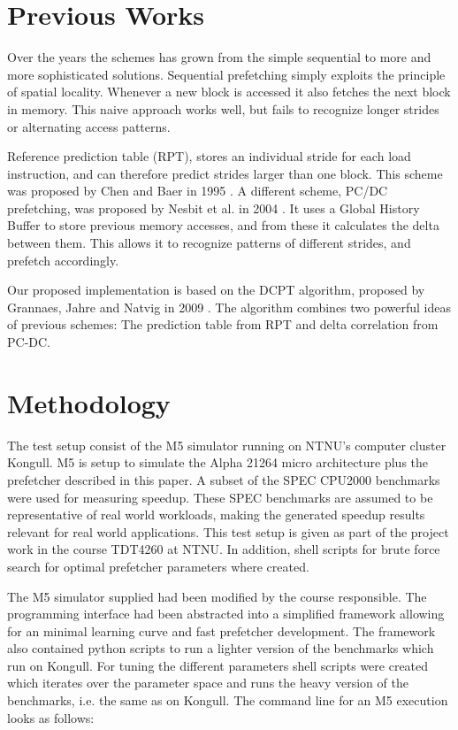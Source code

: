 \documentclass[12pt,journal,compsoc]{IEEEtran}
\begin{document}
\section{Previous Works}
Over the years the schemes has grown from the simple sequential to more and
more sophisticated solutions. Sequential prefetching simply exploits the
principle of spatial locality. Whenever a new block is accessed it also
fetches the next block in memory. This naive approach works well, but fails
to recognize longer strides or alternating access patterns.

Reference prediction table (RPT), stores an individual stride for each load
instruction, and can therefore predict strides larger than one block. This
scheme was proposed by Chen and Baer in 1995 \cite{rptpaper}. A different scheme,
PC/DC prefetching, was proposed by Nesbit et al. in 2004 \cite{pcdcpaper}. It
uses a Global History Buffer to store previous memory accesses, and from these
it calculates the delta between them. This allows it to recognize patterns of
different strides, and prefetch accordingly.

Our proposed implementation is based on the DCPT algorithm, proposed by
Grannaes, Jahre and Natvig in 2009 \cite{dcptpaper}. The algorithm combines two
powerful ideas of previous schemes: The prediction table from RPT and delta
correlation from PC-DC.

\section{Methodology}
The test setup consist of the M5 simulator running on NTNU's computer
cluster Kongull. M5 is setup to simulate the Alpha 21264 micro architecture
plus the prefetcher described in this paper. A subset of the SPEC CPU2000
benchmarks were used for measuring speedup. These SPEC benchmarks are assumed
to be representative of real world workloads, making the generated speedup
results relevant for real world applications. This test setup is given
as part of the project work in the course TDT4260 at NTNU. In addition,
shell scripts for brute force search for optimal prefetcher parameters
where created.

The M5 simulator supplied had been modified by the course responsible. The
programming interface had been abstracted into a simplified framework
allowing for an minimal learning curve and fast prefetcher development. The
framework also contained python scripts to run a lighter version of the
benchmarks which run on Kongull. For tuning the different parameters shell
scripts were created which iterates over the parameter space and runs the
heavy version of the benchmarks, i.e. the same as on Kongull. The command line
for an M5 execution looks as follows:
\end{document}
